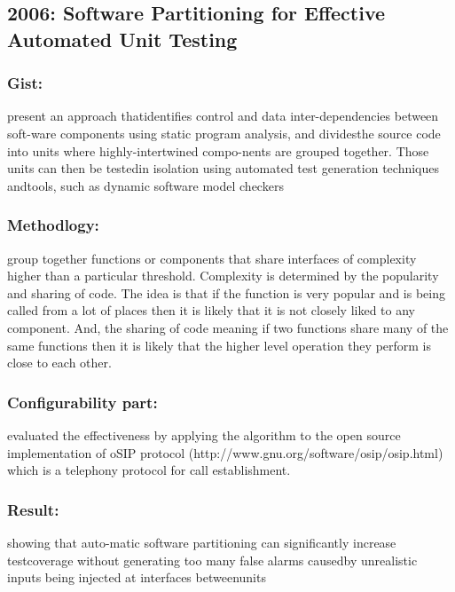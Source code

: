 \documentclass[	runningheads,
				a4paper]{llncs}
\begin{document}

\subsection{2006: Software Partitioning for Effective Automated Unit Testing}
\cite{chakrabarti2006software}

\subsubsection{Gist:}
present an approach thatidentifies control and data inter-dependencies between soft-ware components using static program analysis, and dividesthe source code into units where highly-intertwined compo-nents are grouped together. Those units can then be testedin isolation using automated test generation techniques andtools,  such as dynamic software model checkers

\subsubsection{Methodlogy:}
group together functions or components that share interfaces of complexity higher than 
a particular threshold. Complexity is determined by the popularity and sharing of code. The idea is that 
if the function is very popular and is being called from a lot of places then it is likely that it is not closely liked to any component. 
And, the sharing of code meaning if two functions share many of the same functions then it is likely that the higher level operation they perform is close to each other.

\subsubsection{Configurability part:}
evaluated the effectiveness by applying the algorithm to the open source implementation of oSIP protocol (http://www.gnu.org/software/osip/osip.html) which is a telephony protocol for call establishment. 


\subsubsection{Result:}
showing  that  auto-matic  software  partitioning  can  significantly  increase  testcoverage without generating too many false alarms causedby unrealistic inputs being injected at interfaces betweenunits

\end{document}
